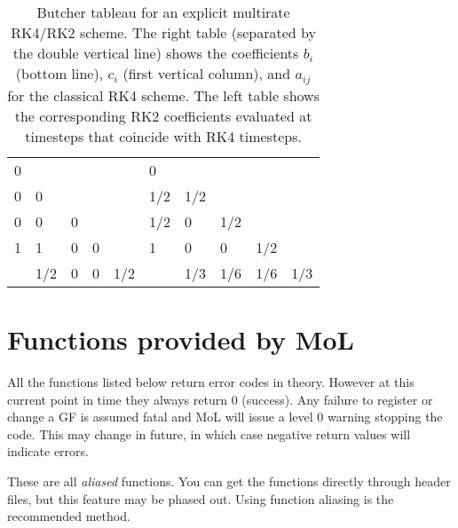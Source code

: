 \begin{table}[th]
\caption{Butcher tableau for an explicit multirate RK4/RK2 scheme. The right table (separated by the double vertical line) shows
the coefficients $b_i$ (bottom line), $c_i$ (first vertical column), and $a_{ij}$ for the classical RK4 scheme.
The left table shows the corresponding RK2 coefficients evaluated at timesteps that coincide with RK4 timesteps.}
\label{tab:CactusBase_MoL_Multirate_butcher}
\begin{tabular}{l|llll||l|llll}
0 &     &   &   &          &   0   & & \\ 
0 & 0   &   &   &          &   1/2 & 1/2\\
0 & 0   & 0 &   &          &   1/2 & 0   & 1/2 &     & \\
1 & 1   & 0 & 0 &          &   1   & 0   & 0   & 1/2 & \\
\hline
 & 1/2 & 0 & 0 & 1/2 &     & 1/3 & 1/6 & 1/6 & 1/3\\
\end{tabular}
\end{table}


\section{Functions provided by MoL}
\label{CactusBase_MoL_sec:molfns}

All the functions listed below return error codes in theory. However
at this current point in time they always return 0 (success). Any
failure to register or change a GF is assumed fatal and MoL will
issue a level 0 warning stopping the code. This may change in future,
in which case negative return values will indicate errors.

These are all \textit{aliased} functions. You can get the functions
directly through header files, but this feature may be phased
out. Using function aliasing is the recommended method.

